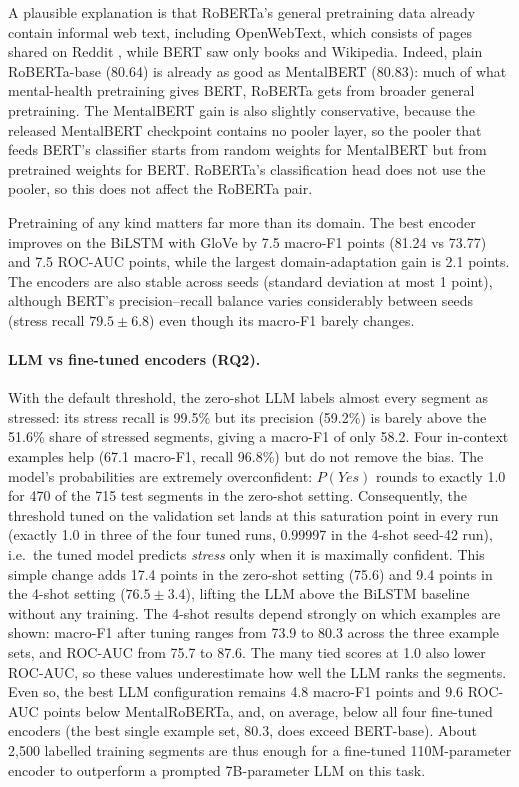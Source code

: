 A plausible explanation is that RoBERTa's general pretraining data already contain informal web
text, including OpenWebText, which consists of pages shared on Reddit \cite{liu2019roberta}, while
BERT saw only books and Wikipedia. Indeed, plain RoBERTa-base (80.64) is already as good as
MentalBERT (80.83): much of what mental-health pretraining gives BERT, RoBERTa gets from broader
general pretraining. The MentalBERT gain is also slightly conservative, because the released
MentalBERT checkpoint contains no pooler layer, so the pooler that feeds BERT's classifier starts from
random weights for MentalBERT but from pretrained weights for BERT. RoBERTa's classification head does
not use the pooler, so this does not affect the RoBERTa pair.

Pretraining of any kind matters far more than its domain. The best encoder improves on the BiLSTM
with GloVe by 7.5 macro-F1 points (81.24 vs 73.77) and 7.5 ROC-AUC points, while the largest
domain-adaptation gain is 2.1 points. The encoders are also stable across seeds (standard deviation
at most 1 point), although BERT's precision--recall balance varies considerably between seeds (stress
recall $79.5 \pm 6.8$) even though its macro-F1 barely changes.

\paragraph{LLM vs fine-tuned encoders (RQ2).}
With the default threshold, the zero-shot LLM labels almost every segment as stressed: its stress
recall is 99.5\% but its precision (59.2\%) is barely above the 51.6\% share of stressed segments,
giving a macro-F1 of only 58.2. Four in-context examples help (67.1 macro-F1, recall 96.8\%) but do not
remove the bias. The model's probabilities are extremely overconfident: $P(\textit{Yes})$ rounds to
exactly 1.0 for 470 of the 715 test segments in the zero-shot setting. Consequently, the threshold
tuned on the validation set lands at this saturation point in every run (exactly 1.0 in three of the four tuned runs, 0.99997 in
the 4-shot seed-42 run), i.e.\ the tuned model
predicts \emph{stress} only when it is maximally confident. This simple change adds 17.4 points in the
zero-shot setting (75.6) and 9.4 points in the 4-shot setting ($76.5 \pm 3.4$), lifting the LLM above
the BiLSTM baseline without any training. The 4-shot results depend strongly on which examples are
shown: macro-F1 after tuning ranges from 73.9 to 80.3 across the three example sets, and ROC-AUC from
75.7 to 87.6. The many tied scores at 1.0 also lower ROC-AUC, so these values underestimate how well
the LLM ranks the segments. Even so, the best LLM configuration remains 4.8 macro-F1 points and 9.6
ROC-AUC points below MentalRoBERTa, and, on average, below all four fine-tuned encoders (the best
single example set, 80.3, does exceed BERT-base). About 2,500 labelled
training segments are thus enough for a fine-tuned 110M-parameter encoder to outperform a prompted
7B-parameter LLM on this task.

